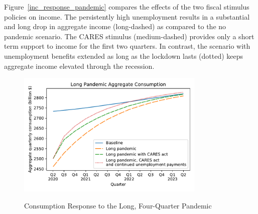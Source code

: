 \documentclass[titlepage,letterpaper]{\econtex}
\begin{document}
Figure~\ref{inc_response_pandemic} compares the effects of the two fiscal stimulus policies on income.
The persistently high unemployment results in a substantial and long drop in aggregate income (long-dashed) as compared to the no pandemic scenario.
The CARES stimulus (medium-dashed) provides only a short term support to income for the first two quarters.
In contrast, the scenario with unemployment benefits extended as long as the lockdown lasts (dotted) keeps aggregate income elevated through the recession.

\begin{figure}
  \centering
  \caption{Consumption Response to the Long, Four-Quarter Pandemic}
  \label{cons_response_pandemic}
  { \includegraphics[width=0.8\textwidth]{./Figures/DeepPandemic}}
\end{figure}
\end{document}
